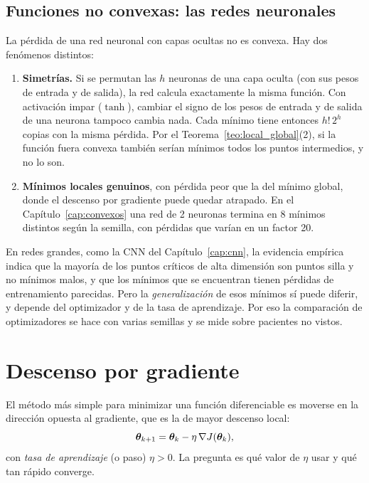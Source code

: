 \subsection{Funciones no convexas: las redes neuronales}
\label{sec:no_convexo}

La pérdida de una red neuronal con capas ocultas no es convexa. Hay dos fenómenos distintos:
\begin{enumerate}
  \item \textbf{Simetrías.} Si se permutan las $h$ neuronas de una capa oculta (con sus pesos de entrada y de
        salida), la red calcula exactamente la misma función. Con activación impar ($\tanh$), cambiar el signo
        de los pesos de entrada y de salida de una neurona tampoco cambia nada. Cada mínimo tiene entonces
        $h!\,2^h$ copias con la misma pérdida. Por el Teorema~\ref{teo:local_global}(2), si la función fuera
        convexa también serían mínimos todos los puntos intermedios, y no lo son.
  \item \textbf{Mínimos locales genuinos}, con pérdida peor que la del mínimo global, donde el descenso por
        gradiente puede quedar atrapado. En el Capítulo~\ref{cap:convexos} una red de 2 neuronas termina en 8
        mínimos distintos según la semilla, con pérdidas que varían en un factor 20.
\end{enumerate}
En redes grandes, como la CNN del Capítulo~\ref{cap:cnn}, la evidencia empírica \parencite{goodfellow2016}
indica que la mayoría de los puntos críticos de alta dimensión son puntos silla y no mínimos malos, y que los
mínimos que se encuentran tienen pérdidas de entrenamiento parecidas. Pero la \emph{generalización} de esos
mínimos sí puede diferir, y depende del optimizador y de la tasa de aprendizaje. Por eso la comparación de
optimizadores se hace con varias semillas y se mide sobre pacientes no vistos.

\section{Descenso por gradiente}
\label{sec:gradiente}

El método más simple para minimizar una función diferenciable es moverse en la dirección opuesta al gradiente,
que es la de mayor descenso local:
\begin{equation}
  \boldsymbol{\theta}_{k+1} = \boldsymbol{\theta}_k - \eta\, \nabla J(\boldsymbol{\theta}_k),
  \label{eq:gd}
\end{equation}
con \emph{tasa de aprendizaje} (o paso) $\eta > 0$. La pregunta es qué valor de $\eta$ usar y qué tan rápido
converge.

